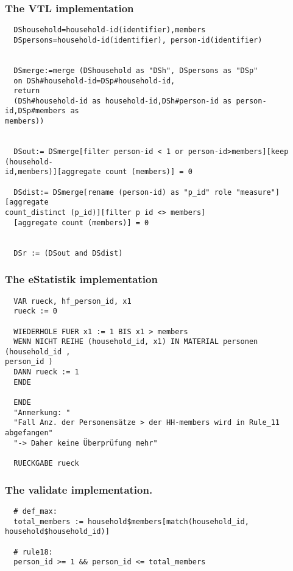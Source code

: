 \subsubsection*{The VTL implementation}
\begin{verbatim}
  DShousehold=household-id(identifier),members
  DSpersons=household-id(identifier), person-id(identifier)


  DSmerge:=merge (DShousehold as "DSh", DSpersons as "DSp"
  on DSh#household-id=DSp#household-id,
  return
  (DSh#household-id as household-id,DSh#person-id as person-id,DSp#members as
members))


  DSout:= DSmerge[filter person-id < 1 or person-id>members][keep (household-
id,members)][aggregate count (members)] = 0

  DSdist:= DSmerge[rename (person-id) as "p_id" role "measure"][aggregate
count_distinct (p_id)][filter p id <> members]
  [aggregate count (members)] = 0


  DSr := (DSout and DSdist)

\end{verbatim}
\subsubsection*{The eStatistik implementation}
\begin{verbatim}
  VAR rueck, hf_person_id, x1
  rueck := 0

  WIEDERHOLE FUER x1 := 1 BIS x1 > members
  WENN NICHT REIHE (household_id, x1) IN MATERIAL personen (household_id ,
person_id )
  DANN rueck := 1
  ENDE

  ENDE
  "Anmerkung: "
  "Fall Anz. der Personensätze > der HH-members wird in Rule_11 abgefangen"
  "-> Daher keine Überprüfung mehr"

  RUECKGABE rueck
\end{verbatim}
\subsubsection*{The validate implementation.}
\begin{verbatim}
  # def_max:
  total_members := household$members[match(household_id, household$household_id)]

  # rule18:
  person_id >= 1 && person_id <= total_members
\end{verbatim}

